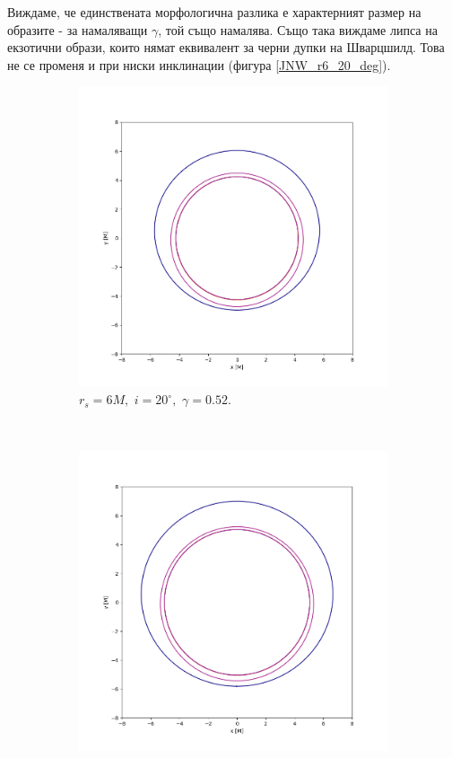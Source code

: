 Виждаме, че единствената морфологична разлика е характерният размер на образите - за намаляващи $\gamma$, той също намалява. Също така виждаме липса на екзотични образи, които нямат еквивалент за черни дупки на Шварцшилд. Това не се променя и при ниски инклинации (фигура \ref{JNW_r6_20_deg}).

\begin{figure}[!htb]
	\centering
	\begin{subfigure}{6cm}
		\includegraphics[scale = 0.3]{JNW_20_deg_r6_gamma_0.52.png}
		\caption{$r_s = 6M,\,\, i = 20^\circ,\,\,\gamma = 0.52$.} 
	\end{subfigure}\,\,\,
	\begin{subfigure}{6cm}
		\includegraphics[scale = 0.3]{JNW_20_deg_r6_gamma_0.8.png}

\end{subfigure}
\end{figure}
